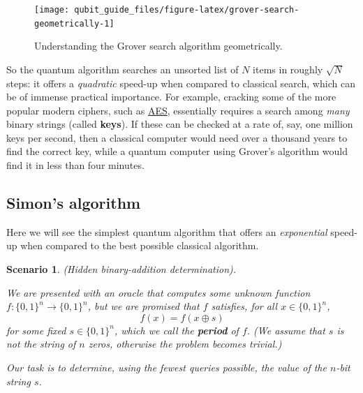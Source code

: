 \documentclass[fleqn,a4paper]{article}
\renewcommand{\footnote}[1]{\sidenotetext[{\color{white}0}\!\!]{\footnotesize #1}}
\newtheorem*{scenario}{Scenario}
\theoremstyle{definition}
\theoremstyle{definition}
\theoremstyle{definition}
\theoremstyle{definition}
\theoremstyle{remark}
\begin{document}
\begin{figure}[H]

{\centering \texttt{[image: qubit\_guide\_files/figure-latex/grover-search-geometrically-1]} 

}

\caption{Understanding the Grover search algorithm geometrically.}\label{fig:grover-search-geometrically}
\end{figure}

So the quantum algorithm searches an unsorted list of \(N\) items in roughly\footnote{Recall that \(M\ll N\), so \(\sqrt{\frac{N}{M}}\approx\sqrt{N}\).} \(\sqrt{N}\) steps: it offers a \emph{quadratic} speed-up when compared to classical search, which can be of immense practical importance.
For example, cracking some of the more popular modern ciphers, such as \href{https://en.wikipedia.org/wiki/Advanced_Encryption_Standard}{AES}, essentially requires a search among \emph{many} binary strings (called \textbf{keys}).
If these can be checked at a rate of, say, one million keys per second, then a classical computer would need over a thousand years to find the correct key, while a quantum computer using Grover's algorithm would find it in less than four minutes.

\hypertarget{simons-algorithm}{%
\subsection{Simon's algorithm}\label{simons-algorithm}}

Here we will see the simplest quantum algorithm that offers an \emph{exponential} speed-up when compared to the best possible classical algorithm.

\begin{scenario}

\emph{(Hidden binary-addition determination).}

We are presented with an oracle that computes some unknown function \(f\colon\{0,1\}^n\to\{0,1\}^n\), but we are promised that \(f\) satisfies, for all \(x\in\{0,1\}^n\),
\[
  f(x) = f(x\oplus s)
\]
for some fixed \(s\in\{0,1\}^n\), which we call the \textbf{period} of \(f\).
(We assume that \(s\) is \emph{not} the string of \(n\) zeros, otherwise the problem becomes trivial.)

Our task is to determine, using the fewest queries possible, the value of the \(n\)-bit string \(s\).

\end{scenario}
\end{document}
